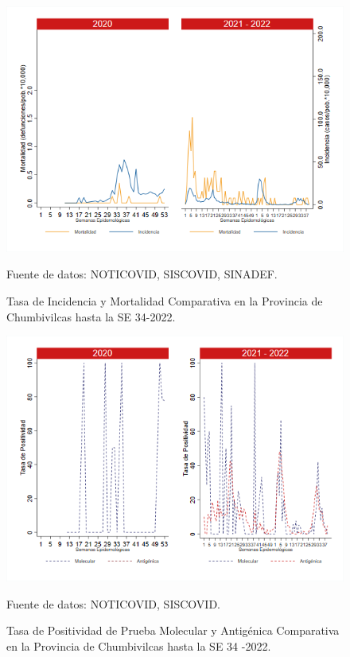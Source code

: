 \documentclass[12pt,a4paper,openany]{book}
\begin{document}
	\begin{figure}[h]
		\caption{Tasa de Incidencia y Mortalidad Comparativa en la Provincia de Chumbivilcas hasta la SE 34-2022.}\label{fig:inc_mort_chumbivilcas}
		\begin{center}
			\includegraphics[width=0.85\linewidth]{../figuras/incidencia_mortalidad_20_21_6.png}
		\end{center}
		{\footnotesize {Fuente de datos: NOTICOVID, SISCOVID, SINADEF.}}
	\end{figure}
	
	\begin{figure}[h]
		\caption{Tasa de Positividad de Prueba Molecular y Antigénica Comparativa en la Provincia de Chumbivilcas hasta la SE 34 -2022.}\label{fig:positividad_chumbivilcas}
		\begin{center}
			\includegraphics[width=0.7\linewidth]{../figuras/positividad_20_21_6.png}
		\end{center}
		{\footnotesize {Fuente de datos: NOTICOVID, SISCOVID.}}
	\end{figure}
	
\end{document}
